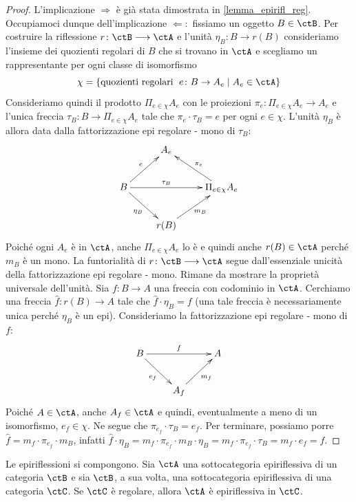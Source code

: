 \begin{proof}
 L'implicazione \(\Rightarrow\) è già stata dimostrata in \ref{lemma_epirifl_reg}. Occupiamoci dunque dell'implicazione
 \(\Leftarrow \colon\) fissiamo un oggetto \(B \in \ctB\). Per costruire la riflessione \(r \colon \ctB \fun \ctA\) e l'unità \(\eta_B \colon B \to r(B)\)
 consideriamo l'insieme dei quozienti regolari di \(B\) che si trovano in \(\ctA\) e scegliamo un  rappresentante per ogni classe di
 isomorfismo
 \[\chi = \{\mbox{quozienti regolari \;} e \colon B \to A_e \mid A_e \in \ctA\}\]
 Consideriamo quindi il prodotto \(\Pi_{e \in \chi}A_e\) con le proiezioni \(\pi_e \colon \Pi_{e \in \chi}A_e \to A_e\) e l'unica freccia
 \(\tau_B \colon B \to \Pi_{e \in \chi}A_e\) tale che \(\pi_e \cdot \tau_B = e\) per ogni \(e \in \chi\). L'unità \(\eta_B\) è
 allora data dalla fattorizzazione epi regolare - mono di \(\tau_B \colon\)
 \[\xymatrix{ & A_e \\ B \ar[rr]^-{\tau_B} \ar[rd]_{\eta_B} \ar[ru]^{e} & & \Pi_{e \in \chi}A_e \ar[lu]_{\pi_e} \\ & r(B) \ar[ru]_{m_B}}\]
 Poiché ogni \(A_e\) è in \(\ctA\), anche \(\Pi_{e \in \chi}A_e\) lo è e quindi anche \(r(B) \in \ctA\) perché \(m_B\) è un mono.
 La funtorialità di \(r \colon \ctB \fun \ctA\) segue dall'essenziale unicità della fattorizzazione epi regolare - mono. Rimane da
 mostrare la proprietà universale dell'unità. Sia \(f \colon B \to A\) una freccia con codominio in \(\ctA\). Cerchiamo una freccia
 \(\widehat{f} \colon r(B) \to A\) tale che \(\widehat{f} \cdot \eta_B = f\) (una tale freccia è necessariamente unica perché
 \(\eta_B\) è un epi). Consideriamo la fattorizzazione epi regolare - mono di \(f \colon\)
 \[\xymatrix{B \ar[rr]^-{f} \ar[rd]_{e_f} & & A \\ & A_f \ar[ru]_{m_f}}\]
 Poiché \(A \in \ctA\), anche \(A_f \in \ctA\) e quindi, eventualmente a meno di un isomorfismo, \(e_f \in \chi\). Ne segue che
 \(\pi_{e_f} \cdot \tau_B = e_f\). Per terminare, possiamo porre \(\widehat{f} = m_f \cdot \pi_{e_f} \cdot m_B\), infatti
 \(\widehat{f} \cdot \eta_B = m_f \cdot \pi_{e_f} \cdot m_B \cdot \eta_B = m_f \cdot \pi_{e_f} \cdot \tau_B = m_f \cdot e_f = f\).
\end{proof}

\begin{exercise}\label{exer_epirifl_comp}
 Le epiriflessioni si compongono. Sia \(\ctA\) una sottocategoria epiriflessiva di un categoria \(\ctB\) e sia \(\ctB\), a sua volta,
 una sottocategoria epiriflessiva di una categoria \(\ctC\). Se \(\ctC\) è regolare, allora \(\ctA\) è epiriflessiva in \(\ctC\).
\end{exercise}

